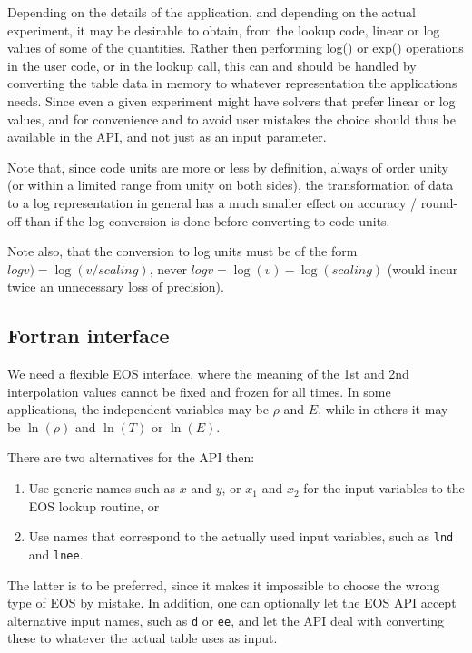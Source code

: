 \documentclass[paper=a4,fontsize=11pt]{scrartcl}
\numberwithin{equation}{section}		%
\numberwithin{figure}{section}			%
\numberwithin{table}{section}				%
\newcommand{\codecolor}{\color{Blue}}
\newcommand{\Code}[1]{{\codecolor\texttt{#1}}}
\begin{document}
Depending on the details of the application, and depending on the actual experiment, it may be desirable to obtain, from the lookup code, linear or log values of some of the quantities.   Rather then performing log() or exp() operations in the user code, or in the lookup call, this can and should be handled by converting the table data in memory to whatever representation the applications needs.  Since even a given experiment might have solvers that prefer linear or log values, and for convenience and to avoid user mistakes the choice should thus be available in the API, and not just as an input parameter.

Note that, since code units are more or less by definition, always of order unity (or within a limited range from unity on both sides), the transformation of data to a log representation in general has a much smaller effect on accuracy / round-off than if the log conversion is done before converting to code units.

Note also, that the conversion to log units must be of the form $logv)=\log(v/scaling)$, never $logv=\log(v)-\log(scaling)$ (would incur twice an unnecessary loss of precision).

\subsection{Fortran interface}
We need a flexible EOS interface, where the meaning of the 1st and 2nd interpolation values cannot be fixed and frozen for all times.  In some applications, the independent variables may be $\rho$ and $E$, while in others it may be $\ln(\rho)$ and $\ln(T)$ or $\ln(E)$.

There are two alternatives for the API then:
\begin{enumerate}
    \item Use generic names such as $x$ and $y$, or $x_1$ and $x_2$ for the input variables to the EOS lookup routine, or
    \item Use names that correspond to the actually used input variables, such as \Code{lnd} and \Code{lnee}.
\end{enumerate}
The latter is to be preferred, since it makes it impossible to choose the wrong type of EOS by mistake.  In addition, one can optionally let the EOS API accept alternative input names, such as \Code{d} or \Code{ee}, and let the API deal with converting these to whatever the actual table uses as input.
\end{document}

